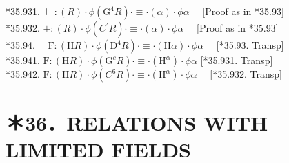 \documentclass[10pt]{article}
\begin{document}
*35.931. $\vdash:(R) \cdot \phi\left(\mathrm{G}^{4} R\right) \cdot \equiv \cdot(\alpha) \cdot \phi \alpha \quad$ [Proof as in *35.93]\\
*35.932. $+:(R) \cdot \phi\left(C^{\prime} R\right) \cdot \equiv \cdot(\alpha) \cdot \phi \alpha \quad$ [Proof as in *35.93]\\
*35.94. $\quad \mathrm{F}:(\mathrm{H} R) \cdot \phi\left(\mathrm{D}^{4} R\right) \cdot \equiv \cdot(\mathrm{H} \alpha) \cdot \phi \alpha \quad$ [*35.93. Transp]\\
*35.941. $\mathrm{F}:(\mathrm{H} R) \cdot \phi\left(\mathrm{G}^{c} R\right) \cdot \equiv \cdot\left(\mathrm{H}^{\alpha}\right) \cdot \phi \alpha$ [*35.931. Transp]\\
*35.942. $\mathrm{F}:(\mathrm{H} R) \cdot \phi\left(C^{6} R\right) \cdot \equiv \cdot\left(\mathrm{H}^{\alpha}\right) \cdot \phi \alpha \quad$ [*35.932. Transp]

\section*{＊36．RELATIONS WITH LIMITED FIELDS}
\end{document}
